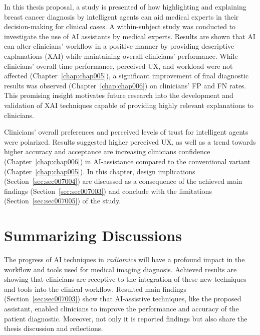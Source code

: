 \clearpage
\label{chap:chap007}

In this thesis proposal, a study is presented of how highlighting and explaining breast cancer diagnosis by intelligent agents can aid medical experts in their decision-making for clinical cases.
A within-subject study was conducted to investigate the use of \ac{AI} assistants by medical experts.
Results are shown that \ac{AI} can alter clinicians' workflow in a positive manner by providing descriptive explanations (\ac{XAI}) while maintaining overall clinicians' performance.
While clinicians' overall time performance, perceived \ac{UX}, and workload were not affected (Chapter~\ref{chap:chap005}), a significant improvement of final diagnostic results was observed (Chapter~\ref{chap:chap006}) on clinicians' \ac{FP} and \ac{FN} rates.
This promising insight motivates future research into the development and validation of \ac{XAI} techniques capable of providing highly relevant explanations to clinicians.

Clinicians' overall preferences and perceived levels of trust for intelligent agents were polarized.
Results suggested higher perceived \ac{UX}, as well as a trend towards higher accuracy and acceptance are increasing clinicians confidence (Chapter~\ref{chap:chap006}) in \ac{AI}-assistance compared to the conventional variant (Chapter~\ref{chap:chap005}).
In this chapter, design implications (Section~\ref{sec:sec007004}) are discussed as a consequence of the achieved main findings (Section~\ref{sec:sec007003}) and conclude with the limitations (Section~\ref{sec:sec007005}) of the study.

\section{Summarizing Discussions}
\label{sec:sec007001}

The progress of \ac{AI} techniques in {\it radiomics} will have a profound impact in the workflow and tools used for medical imaging diagnosis.  
Achieved results are showing that clinicians are receptive to the integration of these new techniques and tools into the clinical workflow.
Resulted main findings (Section~\ref{sec:sec007003}) show that \ac{AI}-assistive techniques, like the proposed assistant, enabled clinicians to improve the performance and accuracy of the patient diagnostic.
Moreover, not only it is reported findings but also share the thesis discussion and reflections.

